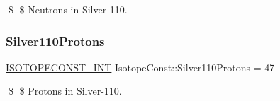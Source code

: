 \$ \$ Neutrons in Silver-\/110. \mbox{\label{group___isotope_const-_silver-_ag110_ga6c13ff82dffaabb5571b8b3fdbe4544d}} 
\subsubsection{\texorpdfstring{Silver110\+Protons}{Silver110Protons}}
{\footnotesize\ttfamily \mbox{\hyperlink{group___isotope_const-_macros_ga5f18360b3e99483a35c32d789e62621c}{I\+S\+O\+T\+O\+P\+E\+C\+O\+N\+S\+T\+\_\+\+I\+NT}} Isotope\+Const\+::\+Silver110\+Protons = 47}

\$ \$ Protons in Silver-\/110. 